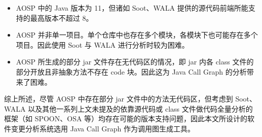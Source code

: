 \begin{itemize}
    \item AOSP 中的 Java 版本为 11，但诸如 Soot、WALA 提供的源代码前端所能支持的最高版本不超过 8。
    \item AOSP 并非单一项目。单个仓库中也存在多个模块，各模块下也可能存在多个项目。因此使用 Soot 与 WALA 进行分析时较为困难。
    \item AOSP 所生成的部分 jar 文件存在无代码区的情况，即 jar 内各 class 文件的部分开放且非抽象方法不存在 code 块。因此这为 Java Call Graph 的分析带来了困难。
\end{itemize}

综上所述，尽管 AOSP 中存在部分 jar 文件中的方法无代码区，但考虑到 Soot、WALA 以及其他一系列上文未提及的依靠源代码或 class 文件做代码全量分析的框架（如 SPOON、OSA 等）均存在可能的版本支持问题，因此本文所设计的软件变更分析系统选用 Java Call Graph 作为调用图生成工具。